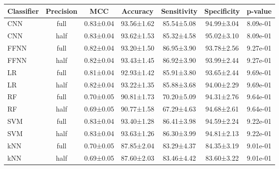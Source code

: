 \begin{tabular}{lcccccc}
\toprule
Classifier & Precision &       MCC &   Accuracy & Sensitivity & Specificity &  p-value \\
\midrule
       CNN &      full & 0.83±0.04 & 93.56±1.62 &  85.54±5.08 &  94.99±3.04 & 8.09e-01 \\
       CNN &      half & 0.83±0.04 & 93.62±1.53 &  85.32±4.58 &  95.02±3.10 & 8.09e-01 \\
      FFNN &      full & 0.82±0.04 & 93.20±1.50 &  86.95±3.90 &  93.78±2.56 & 9.27e-01 \\
      FFNN &      half & 0.82±0.04 & 93.43±1.45 &  86.92±3.90 &  93.99±2.44 & 9.27e-01 \\
        LR &      full & 0.81±0.04 & 92.93±1.42 &  85.91±3.80 &  93.65±2.44 & 9.69e-01 \\
        LR &      half & 0.82±0.04 & 93.22±1.35 &  85.88±3.68 &  94.00±2.29 & 9.69e-01 \\
        RF &      full & 0.70±0.05 & 90.81±1.73 &  70.20±5.09 &  94.31±2.76 & 9.64e-01 \\
        RF &      half & 0.69±0.05 & 90.77±1.58 &  67.29±4.63 &  94.68±2.61 & 9.64e-01 \\
       SVM &      full & 0.83±0.04 & 93.40±1.28 &  86.41±3.98 &  94.59±2.24 & 9.22e-01 \\
       SVM &      half & 0.83±0.04 & 93.63±1.26 &  86.30±3.99 &  94.81±2.13 & 9.22e-01 \\
       kNN &      full & 0.70±0.05 & 87.85±2.04 &  83.29±4.37 &  84.35±3.19 & 9.01e-01 \\
       kNN &      half & 0.69±0.05 & 87.60±2.03 &  83.46±4.42 &  83.60±3.22 & 9.01e-01 \\
\bottomrule
\end{tabular}
